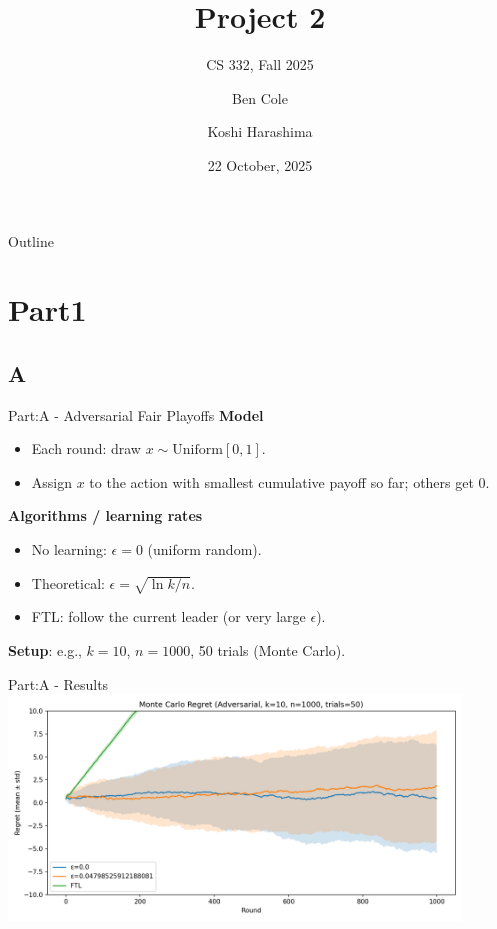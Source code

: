 \documentclass{beamer}
\title[Project 2]{Project 2}
\subtitle{CS 332, Fall 2025}
\author{Ben Cole \and Koshi Harashima}
\date{22 October, 2025}
\begin{document}
\maketitle

\begin{frame}{Outline}
  \tableofcontents
\end{frame}

\section{Part1}


\subsection{A}
\begin{frame}{Part:A - Adversarial Fair Playoffs}
\textbf{Model}
\begin{itemize}
  \item Each round: draw \(x \sim \mathrm{Uniform}[0,1]\).
  \item Assign \(x\) to the action with smallest cumulative payoff so far; others get 0.
\end{itemize}
\textbf{Algorithms / learning rates}
\begin{itemize}
  \item No learning: \(\epsilon = 0\) (uniform random).
  \item Theoretical: \(\epsilon = \sqrt{\ln k / n}\).
  \item FTL: follow the current leader (or very large \(\epsilon\)).
\end{itemize}
\textbf{Setup}: e.g., \(k=10\), \(n=1000\), 50 trials (Monte Carlo).
\end{frame}

\begin{frame}{Part:A - Results}
\includegraphics[width=0.9\textwidth]{figures/adv_mc_regret.png}

\end{frame}
\end{document}
